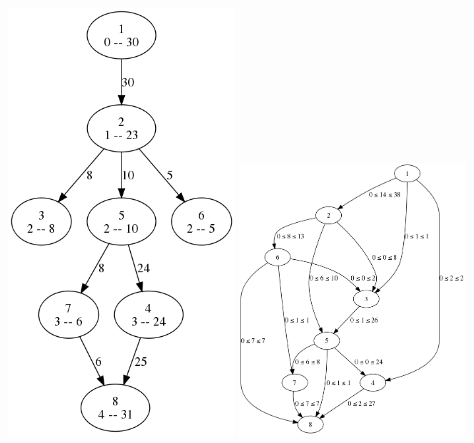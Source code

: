   \includegraphics[width=0.45\textwidth]{img/4-level-graph.png}
  \includegraphics[width=0.45\textwidth]{img/5-graph.png}

